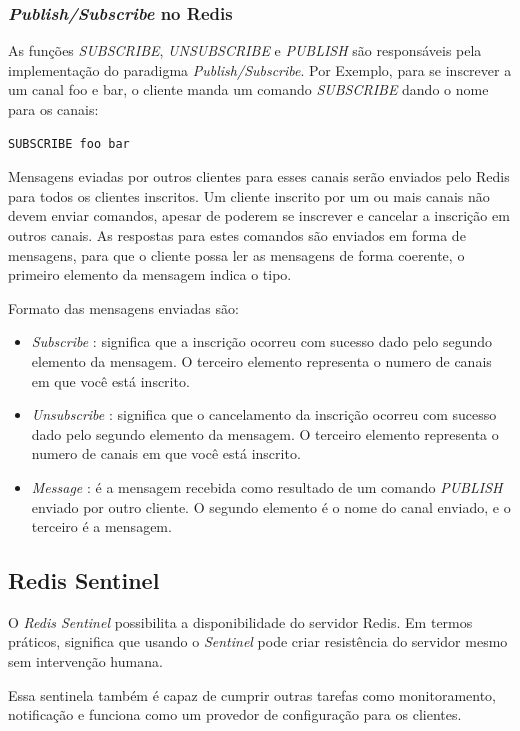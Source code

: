 \documentclass[10pt]{IEEEtran}
\begin{document}
\subsubsection{\textit{Publish/Subscribe} no Redis}

As funções \textit{SUBSCRIBE}, \textit{UNSUBSCRIBE} e \textit{PUBLISH} são responsáveis pela implementação do paradigma \textit{Publish/Subscribe}. Por Exemplo, para se inscrever a um canal foo e bar, o cliente manda um comando \textit{SUBSCRIBE} dando o nome para os canais:
\begin{lstlisting}
SUBSCRIBE foo bar
\end{lstlisting}

Mensagens eviadas por outros clientes para esses canais serão enviados pelo Redis para todos os clientes inscritos.
Um cliente inscrito por um ou mais canais não devem enviar comandos, apesar de poderem se inscrever e cancelar a inscrição em outros canais. As respostas para estes comandos são enviados em forma de mensagens, para que o cliente possa ler as mensagens de forma coerente, o primeiro elemento da mensagem indica o tipo.

Formato das mensagens enviadas são:
\begin{itemize}
\item \textit{Subscribe} : significa que a inscrição ocorreu com sucesso dado pelo segundo elemento da mensagem. O terceiro elemento representa o numero de canais em que você está inscrito.
\item \textit{Unsubscribe} : significa que o cancelamento da inscrição ocorreu com sucesso dado pelo segundo elemento da mensagem. O terceiro elemento representa o numero de canais em que você está inscrito.
\item \textit{Message} : é a mensagem recebida como resultado de um comando \textit{PUBLISH} enviado por outro cliente. O segundo elemento é o nome do canal enviado, e o terceiro é a mensagem.  
\end{itemize}

\subsection{Redis Sentinel}

O \textit{Redis Sentinel} possibilita a disponibilidade do servidor Redis. Em termos práticos, significa que usando o \textit{Sentinel} pode criar resistência do servidor mesmo sem intervenção humana.

Essa sentinela também é capaz de cumprir outras tarefas como monitoramento, notificação e funciona como um provedor de configuração para os clientes.
\end{document}

